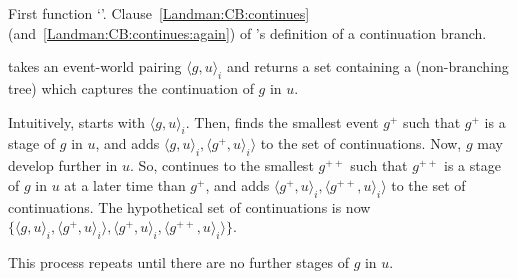 \begin{note}
  First function `\AlgAC{}'.
  Clause~\ref{Landman:CB:continues} (and~\ref{Landman:CB:continues:again}) of \citeauthor{Landman:1992wh}'s definition of a continuation branch.

  \begin{algorithm}[H]
    \label{PrAl:g-a-c}
    \caption{\AlgAC{}}
    \SetAlgoLined
    \DontPrintSemicolon
  \end{algorithm}

  \AlgAC{} takes an event-world pairing \(\langle g,u \rangle_{i}\) and returns a set containing a (non-branching tree) which captures the continuation of \(g\) in \(u\).

  Intuitively, \AlgAC{} starts with \(\langle g,u \rangle_{i}\).
  Then, \AlgAC{} finds the smallest event \(g^{+}\) such that \(g^{+}\) is a stage of \(g\) in \(u\), and adds \(\langle g,u \rangle_{i}, \langle g^{+},u \rangle_{i} \rangle\) to the set of continuations.
  Now, \(g\) may develop further in \(u\).
  So, \AlgAC{} continues to the smallest \(g^{++}\) such that \(g^{++}\) is a stage of \(g\) in \(u\) at a later time than \(g^{+}\), and adds \(\langle g^{+},u \rangle_{i}, \langle g^{++},u \rangle_{i} \rangle\) to the set of continuations.
  The hypothetical set of continuations is now \(\{\langle g,u \rangle_{i}, \langle g^{+},u \rangle_{i} \rangle, \langle g^{+},u \rangle_{i}, \langle g^{++},u \rangle_{i} \rangle\}\).

  This process repeats until there are no further stages of \(g\) in \(u\).
\end{note}

